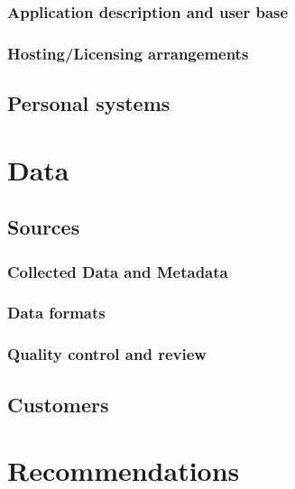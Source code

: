 \documentclass[12pt,a4paper]{report}
\begin{document}
\begin{linenumbers}
\subsection{Application description and user base}
\subsection{Hosting/Licensing arrangements}
\section{Personal systems}

\chapter{Data}
\section{Sources}
\subsection{Collected Data and Metadata}
\subsection{Data formats}
\subsection{Quality control and review}
\section{Customers}

\chapter{Recommendations}

\end{linenumbers} %
\clearpage

\appendix

\clearpage

\printbibliography[heading=bibintoc]
\clearpage
\end{document}
